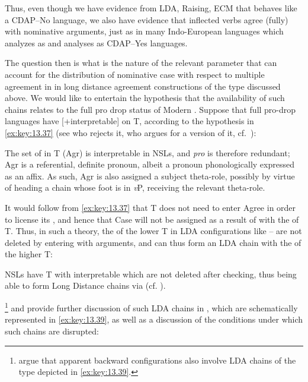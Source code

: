 \documentclass[output=paper]{langsci/langscibook}
\begin{document}
\begin{exe}
Thus, even though we have evidence from \gls{LDA}, Raising,
\gls{ECM} that  behaves like a CDAP–No
language, we also have evidence that inflected verbs agree (fully) with
nominative arguments, just as in many Indo-European
languages which \citet{Baker2015} analyzes as  and \citet{Baker2008}
analyses as CDAP–Yes languages.

The question then is what is the nature of the relevant parameter that can
account for the distribution of nominative case with respect to multiple
agreement in  in long distance agreement constructions of the type
discussed above. We would like to entertain the hypothesis that the
availability of such chains relates to the full pro drop status of Modern
. Suppose that full pro-drop languages have [+interpretable]
 on T, according to the hypothesis in \eqref{ex:key:13.37} (see
\citealt{Holmberg2005} who rejects it, \citealt{Barbosa2009} who argues for a
version of it, cf.\ \citealt{AleAna1998}):

\ea%
    \label{ex:key:13.37}
    The set of  in T (Agr) is interpretable in \glspl{NSL}, and
    \emph{pro} is therefore redundant; Agr is a referential, definite pronoun,
    albeit a pronoun phonologically expressed as an affix. As such, Agr is also
    assigned a subject theta-role, possibly by virtue of heading a chain whose
    foot is in \emph{v}P,   receiving the relevant theta-role.
\z

It would follow from \eqref{ex:key:13.37} that T does not need to enter Agree
in order to license its , and hence that \Nom{} Case will not be
assigned as a result of  with the  of T. Thus, in such a
theory, the  of the lower T in \gls{LDA} configurations like
-- are not deleted by entering  with
\Nom{} arguments, and can thus form an \gls{LDA} chain with the  of
the higher T:

\ea%
    \label{ex:key:13.38}
    \glspl{NSL} have T with interpretable  which are not deleted after
    checking, thus being able to form Long Distance chains via  (cf.
    \citealt{Ura1994}).
\z

\textcite{TsaAnaAle2017,TsaAleAna2019}\footnote{\citeauthor{TsaAnaAle2017}
argue that apparent backward  configurations also involve \gls{LDA}
chains of the type depicted in \eqref{ex:key:13.39}.} and \citet{AleAna2019} provide
further discussion of such \gls{LDA} chains in , which are schematically
represented in \eqref{ex:key:13.39}, as well as a discussion of the conditions under
which such chains are disrupted:


\end{exe}
\end{document}
